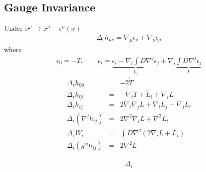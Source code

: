 \documentclass[10pt,letterpaper]{article}
\numberwithin{equation}{section}
\begin{document}
\begin{appendices}
\subsection{Gauge Invariance}

Under $x^\mu \to x^\mu - \epsilon^\mu(x)$
\begin{eqnarray}
\Delta_\epsilon h_{\mu\nu} = \nabla_\mu \epsilon_\nu + \nabla_\nu \epsilon_\mu
\end{eqnarray}
where
\begin{eqnarray}
\epsilon_0 = -T,\qquad \epsilon_i = \underbrace{ \epsilon_i - \nabla_i \int D \nabla^j \epsilon_j}_{L_i} + 
\nabla_i \underbrace{ \int D \nabla^j \epsilon_j}_{L} 
\end{eqnarray}
\begin{eqnarray}
\Delta_\epsilon h_{00} &=& -2\dot T
\nonumber\\
\Delta_\epsilon h_{0i} &=& -\nabla_i T + \dot L_i + \nabla_i \dot L
\nonumber\\
\Delta_\epsilon h_{ij} &=& 2\nabla_i\nabla_j L + \nabla_i L_j + \nabla_j L_i 
\nonumber\\
 \Delta_\epsilon (\nabla^j h_{ij})&=& 2\nabla^2 \nabla_i L + \nabla^2 L_i
\nonumber\\
\Delta_\epsilon W_i &=& \int D \nabla^2 (2\nabla_i L + L_i)
\nonumber\\
\Delta_\epsilon (g^{ij}h_{ij}) &=& 2\nabla^2 L
\end{eqnarray}

\begin{eqnarray}
\Delta_\epsilon
\end{eqnarray}


\end{appendices}
\end{document}
